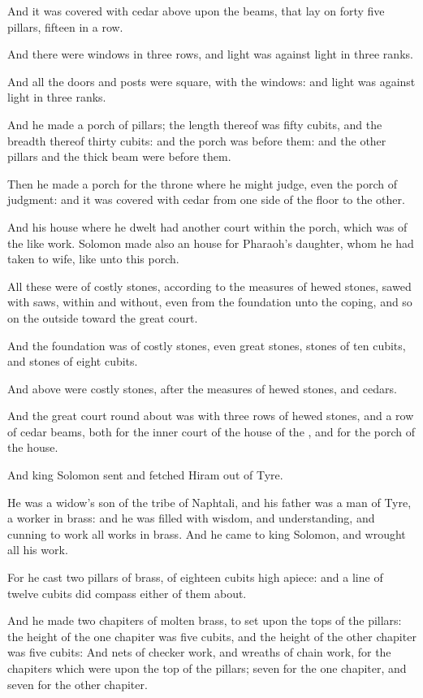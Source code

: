 \Verse And it was covered with cedar above upon the beams, that lay on forty five pillars, fifteen in a row.

\Verse And there were windows in three rows, and light was against light in three ranks.

\Verse And all the doors and posts were square, with the windows: and light was against light in three ranks.

\Verse And he made a porch of pillars; the length thereof was fifty cubits, and the breadth thereof thirty cubits: and the porch was before them: and the other pillars and the thick beam were before them.

\Verse Then he made a porch for the throne where he might judge, even the porch of judgment: and it was covered with cedar from one side of the floor to the other.

\Verse And his house where he dwelt had another court within the porch, which was of the like work. Solomon made also an house for Pharaoh's daughter, whom he had taken to wife, like unto this porch.

\Verse All these were of costly stones, according to the measures of hewed stones, sawed with saws, within and without, even from the foundation unto the coping, and so on the outside toward the great court.

\Verse And the foundation was of costly stones, even great stones, stones of ten cubits, and stones of eight cubits.

\Verse And above were costly stones, after the measures of hewed stones, and cedars.

\Verse And the great court round about was with three rows of hewed stones, and a row of cedar beams, both for the inner court of the house of the \LORD, and for the porch of the house.

\Verse And king Solomon sent and fetched Hiram out of Tyre.

\Verse He was a widow's son of the tribe of Naphtali, and his father was a man of Tyre, a worker in brass: and he was filled with wisdom, and understanding, and cunning to work all works in brass. And he came to king Solomon, and wrought all his work.

\Verse For he cast two pillars of brass, of eighteen cubits high apiece: and a line of twelve cubits did compass either of them about.

\Verse And he made two chapiters of molten brass, to set upon the tops of the pillars: the height of the one chapiter was five cubits, and the height of the other chapiter was five cubits: \Verse And nets of checker work, and wreaths of chain work, for the chapiters which were upon the top of the pillars; seven for the one chapiter, and seven for the other chapiter.

